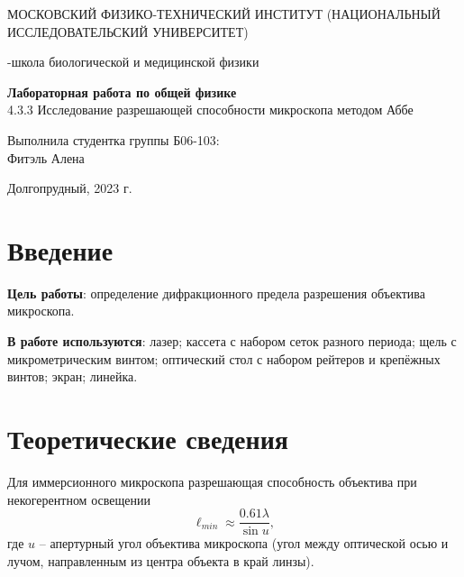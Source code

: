\documentclass{article}
\begin{document}
\def\figurename{Рисунок}
\begin{titlepage}
\begin{center}
    {\large МОСКОВСКИЙ ФИЗИКО-ТЕХНИЧЕСКИЙ ИНСТИТУТ (НАЦИОНАЛЬНЫЙ ИССЛЕДОВАТЕЛЬСКИЙ УНИВЕРСИТЕТ)}
\end{center}
\begin{center}
    {-школа биологической и медицинской физики}
\end{center}

\vspace{1cm}
{\huge
\begin{center}
    {\bf Лабораторная работа по общей физике}\\
    \vspace{0.5cm}
    4.3.3 Исследование разрешающей способности микроскопа методом Аббе
\end{center}
}

\vspace{4cm}
\begin{flushright}
{\LARGE Выполнила студентка группы Б06-103:\\ Фитэль Алена \\}

\end{flushright}
\vspace{9cm}
\begin{center}
    Долгопрудный, 2023 г.
\end{center}
\end{titlepage}
\newpage
\section{Введение}


\textbf{Цель работы}: определение дифракционного предела разрешения объектива микроскопа.

\textbf{В работе используются}: лазер; кассета с набором сеток разного периода; щель с микрометрическим винтом; оптический стол с набором рейтеров и крепёжных винтов; экран; линейка.


\section{Теоретические сведения}
Для иммерсионного микроскопа разрешающая способность объектива при некогерентном освещении
\begin{equation}
\ell_{min} \approx \dfrac{0.61\lambda}{\sin u},
\end{equation}
где $u$ -- апертурный угол объектива микроскопа (угол между оптической осью и лучом, направленным из центра объекта в край линзы).
\end{document}
